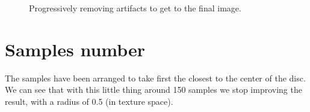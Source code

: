 \documentclass[12pt, twoside,a4paper]{article}
\begin{document}
\begin{figure}
{  \label{fig:ss1}
}
\caption{Progressively removing artifacts to get to the final image. }
\label{fig:img}
\end{figure} 

\clearpage
\section{Samples number}

The samples have been arranged to take first the closest to the center of the disc. We can see that with this little thing around 150 samples we stop improving the result, with a radius of 0.5 (in texture space).
\end{document}
